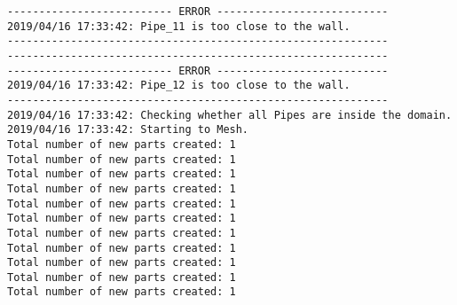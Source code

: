 \documentclass{article}
\begin{document}
{\begin{verbatim}
-------------------------- ERROR ---------------------------
2019/04/16 17:33:42: Pipe_11 is too close to the wall.
------------------------------------------------------------
------------------------------------------------------------
-------------------------- ERROR ---------------------------
2019/04/16 17:33:42: Pipe_12 is too close to the wall.
------------------------------------------------------------
2019/04/16 17:33:42: Checking whether all Pipes are inside the domain.
2019/04/16 17:33:42: Starting to Mesh.
Total number of new parts created: 1
Total number of new parts created: 1
Total number of new parts created: 1
Total number of new parts created: 1
Total number of new parts created: 1
Total number of new parts created: 1
Total number of new parts created: 1
Total number of new parts created: 1
Total number of new parts created: 1
Total number of new parts created: 1
Total number of new parts created: 1
\end{verbatim}
}
\clearpage
\end{document}
